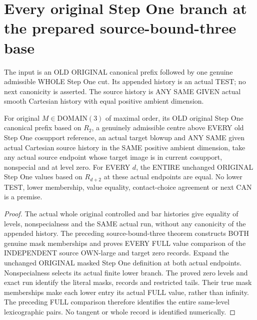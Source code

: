 \section{Every original Step One branch at the prepared source-bound-three base}

The input is an OLD ORIGINAL canonical prefix followed by one genuine
admissible WHOLE Step One cut. Its appended history is an actual TEST;
no next canonicity is asserted. The source history is ANY SAME GIVEN
actual smooth Cartesian history with equal positive ambient dimension.

\begin{theorem}
\label{hir:original-prepared-bound-three-zero-stepone-etale-values}
\leanok
For original $M\in\mathrm{DOMAIN}(3)$ of maximal order, its OLD original
Step One canonical prefix based on $R_2$, a genuinely admissible centre
above EVERY old Step One cosupport reference, an actual target blowup
and ANY SAME given actual Cartesian source history in the SAME positive
ambient dimension, take any actual source endpoint whose target image
is in current cosupport, nonspecial and at level zero. For EVERY $d$,
the ENTIRE unchanged ORIGINAL Step One values based on $R_{d+2}$ at
these actual endpoints are equal. No lower TEST, lower membership,
value equality, contact-choice agreement or next CAN is a premise.
\end{theorem}
\begin{proof}
The actual whole original controlled and bar histories give equality of
levels, nonspecialness and the SAME actual run, without any canonicity
of the appended history. The preceding source-bound-three theorem
constructs BOTH genuine mask memberships and proves EVERY FULL value
comparison of the INDEPENDENT source OWN-large and target zero records.
Expand the unchanged ORIGINAL masked Step One definition at both actual
endpoints. Nonspecialness selects its actual finite lower branch. The
proved zero levels and exact run identify the literal masks, records
and restricted tails. Their true mask memberships make each lower
entry its actual FULL value, rather than infinity. The preceding FULL
comparison therefore identifies the entire same-level lexicographic
pairs. No tangent or whole record is identified numerically.
\end{proof}

